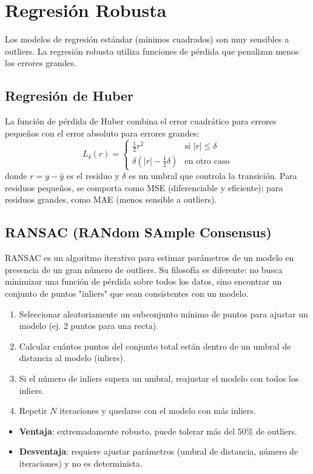 \documentclass[12pt,a4paper,openany,oneside]{book}
\begin{document}
\section{Regresión Robusta}

Los modelos de regresión estándar (mínimos cuadrados) son muy sensibles a outliers. La regresión robusta utiliza funciones de pérdida que penalizan menos los errores grandes.

\subsection{Regresión de Huber}
La función de pérdida de Huber combina el error cuadrático para errores pequeños con el error absoluto para errores grandes:
\[
L_{\delta}(r) = 
\begin{cases}
\frac{1}{2} r^2 & \text{si } |r| \le \delta \\
\delta(|r| - \frac{1}{2}\delta) & \text{en otro caso}
\end{cases}
\]
donde \(r = y - \hat{y}\) es el residuo y \(\delta\) es un umbral que controla la transición. Para residuos pequeños, se comporta como MSE (diferenciable y eficiente); para residuos grandes, como MAE (menos sensible a outliers).

\subsection{RANSAC (RANdom SAmple Consensus)}
RANSAC es un algoritmo iterativo para estimar parámetros de un modelo en presencia de un gran número de outliers. Su filosofía es diferente: no busca minimizar una función de pérdida sobre todos los datos, sino encontrar un conjunto de puntos "inliers" que sean consistentes con un modelo.

\begin{enumerate}
    \item Seleccionar aleatoriamente un subconjunto mínimo de puntos para ajustar un modelo (ej. 2 puntos para una recta).
    \item Calcular cuántos puntos del conjunto total están dentro de un umbral de distancia al modelo (inliers).
    \item Si el número de inliers supera un umbral, reajustar el modelo con todos los inliers.
    \item Repetir \(N\) iteraciones y quedarse con el modelo con más inliers.
\end{enumerate}

\begin{itemize}
    \item \textbf{Ventaja}: extremadamente robusto, puede tolerar más del 50\% de outliers.
    \item \textbf{Desventaja}: requiere ajustar parámetros (umbral de distancia, número de iteraciones) y no es determinista.
\end{itemize}
\end{document}
